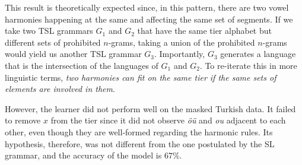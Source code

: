 \begin{table}[h!]
\centering
{}
\caption{TSL learning of several harmonies with blockers; abstract representation.}
\end{table}

This result is theoretically expected since, in this pattern, there are two vowel harmonies happening at the same and affecting the same set of segments.
If we take two TSL grammars $G_1$ and $G_2$ that have the same tier alphabet but different sets of prohibited $n$-grams, taking a union of the prohibited $n$-grams would yield us another TSL grammar $G_3$.
Importantly, $G_3$ generates a language that is the intersection of the languages of $G_1$ and $G_2$.
To re-iterate this in more linguistic terms, \emph{two harmonies can fit on the same tier if the same sets of elements are involved in them}.




However, the learner did not perform well on the masked Turkish data.
It failed to remove $x$ from the tier since it did not observe \emph{\"o\"u} and \emph{ou} adjacent to each other, even though they are well-formed regarding the harmonic rules.
Its hypothesis, therefore, was not different from the one postulated by the SL grammar, and the accuracy of the model is $67$\%.

